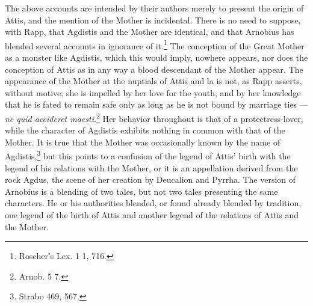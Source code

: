 \documentclass[a4paper, 11pt, oneside, polutonikogreek, english]{article}
\begin{document}
The above accounts are intended by their authors merely to present the origin of Attis, and the mention of the Mother is incidental. There is no need to suppose, with Rapp, that Agdistis and the Mother are identical, and that Arnobius has blended several accounts in ignorance of it.\footnote{Roscher's Lex. 1 1, 716.} The conception of the Great Mother as a monster like Agdistis, which this would imply, nowhere appears, nor does the conception of Attis as in any way a blood descendant of the Mother appear. The appearance of the Mother at the nuptials of Attis and la is not, as Rapp asserts, without motive; she is impelled by her love for the youth, and by her knowledge that he is fated to remain safe only as long as he is not bound by marriage ties --- \emph{ne quid accideret maesti}.\footnote{Arnob. 5 7.} Her behavior throughout is that of a protectress-lover, while the character of Agdistis exhibits nothing in common with that of the Mother. It is true that the Mother was occasionally known by the name of Agdistis,\footnote{Strabo 469, 567.} but this points to a confusion of the legend of Attis' birth with the legend of his relations with the Mother, or it is an appellation derived from the rock Agdus, the scene of her creation by Deucalion and Pyrrha. The version of Arnobius is a blending of two tales, but not two tales presenting the same characters. He or his authorities blended, or found already blended by tradition, one legend of the birth of Attis and another legend of the relations of Attis and the Mother.
\end{document}
